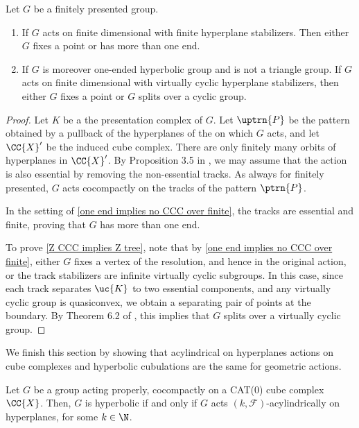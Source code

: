 \begin{proposition}\label{cube complexes to trees}
	Let $G$ be a finitely presented group. 
	\begin{enumerate}
	\item \label{one end implies no CCC over finite} If $G$ acts on finite dimensional \CCC with finite hyperplane stabilizers. Then either $G$ fixes a point or has more than one end.
	\item \label{Z CCC implies Z tree}
	If $G$ is moreover one-ended hyperbolic group and is not a triangle group. If $G$ acts on finite dimensional \CCC with virtually cyclic hyperplane stabilizers, then either $G$ fixes a point or $G$ splits over a cyclic group.
	\end{enumerate}
\end{proposition}

\begin{proof}
	Let $K$ be a the presentation complex of $G$.
	Let $\uptrn{P}$ be the pattern obtained by a pullback of the hyperplanes of the \CCC on which $G$ acts, and let $\CC{X}'$ be the induced cube complex.
	There are only finitely many orbits of hyperplanes in $\CC{X}'$.
	By Proposition 3.5 in \cite{CaSa11}, we may assume that the action is also essential by removing the non-essential tracks. 
	As always for finitely presented, $G$ acts cocompactly on the tracks of the pattern $\ptrn{P}$. 
	
	In the setting of \ref{one end implies no CCC over finite}, the tracks are essential and finite, proving that $G$ has more than one end.
	
	
	To prove \ref{Z CCC implies Z tree}, note that 
	by \ref{one end implies no CCC over finite}, either $G$ fixes a vertex of the resolution, and hence in the original action, or the track stabilizers are infinite virtually cyclic subgroups.
	In this case, since each track separates $\uc{K}$ to two essential components, and any virtually cyclic group is quasiconvex, we obtain a separating pair of points at the boundary.
	By Theorem 6.2 of \cite{Bow98}, this implies that $G$ splits over a virtually cyclic group.
\end{proof}

We finish this section by showing that acylindrical on hyperplanes actions on cube complexes and hyperbolic cubulations are the same for geometric actions.

\begin{proposition}\label{hyperbolicity acylindricity}
	Let $G$ be a group acting properly, cocompactly  on a CAT(0) cube complex $\CC{X}$. Then, $G$ is hyperbolic if and only if $G$ acts $(k,\mathcal F)$-acylindrically on hyperplanes, for some $k\in\N$.
\end{proposition}

